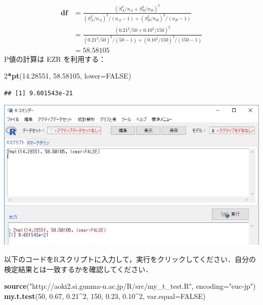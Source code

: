 \documentclass[11pt,]{problemset}
\newenvironment{Shaded}{\begin{snugshade}}{\end{snugshade}}
\newcommand{\DataTypeTok}[1]{\textcolor[rgb]{0.13,0.29,0.53}{#1}}
\newcommand{\DecValTok}[1]{\textcolor[rgb]{0.00,0.00,0.81}{#1}}
\newcommand{\FloatTok}[1]{\textcolor[rgb]{0.00,0.00,0.81}{#1}}
\newcommand{\KeywordTok}[1]{\textcolor[rgb]{0.13,0.29,0.53}{\textbf{#1}}}
\newcommand{\NormalTok}[1]{#1}
\newcommand{\OperatorTok}[1]{\textcolor[rgb]{0.81,0.36,0.00}{\textbf{#1}}}
\newcommand{\OtherTok}[1]{\textcolor[rgb]{0.56,0.35,0.01}{#1}}
\newcommand{\StringTok}[1]{\textcolor[rgb]{0.31,0.60,0.02}{#1}}
\begin{document}
\[
\begin{aligned}
\mathbf{df} & = \frac{(S^2_A/n_A + S^2_B/n_B)^2}{(S_A^2/n_A)^2/(n_A-1)+(S_B^2/n_B)^2/(n_B-1)} \\
            & = \frac{(0.21^2/50 + 0.10^2/150)^2}{(0.21^2/50)^2/(50-1)+(0.10^2/150)^2/(150-1)} \\
            & = 58.58105
\end{aligned}
\] P値の計算は EZR を利用する：

\begin{Shaded}
\begin{Highlighting}[]
\DecValTok{2}\OperatorTok{*}\KeywordTok{pt}\NormalTok{(}\FloatTok{14.28551}\NormalTok{, }\FloatTok{58.58105}\NormalTok{, }\DataTypeTok{lower=}\OtherTok{FALSE}\NormalTok{)}
\end{Highlighting}
\end{Shaded}

\begin{verbatim}
## [1] 9.601543e-21
\end{verbatim}

\begin{center}\includegraphics[width=0.9\linewidth]{pic/tvaluepvalue01} \end{center}
\bigskip

以下のコードをRスクリプトに入力して，実行をクリックしてください．自分の検定結果とは一致するかを確認してください．

\begin{Shaded}
\begin{Highlighting}[]
\KeywordTok{source}\NormalTok{(}\StringTok{"http://aoki2.si.gunma-u.ac.jp/R/src/my_t_test.R"}\NormalTok{, }\DataTypeTok{encoding=}\StringTok{"euc-jp"}\NormalTok{)}
\KeywordTok{my.t.test}\NormalTok{(}\DecValTok{50}\NormalTok{, }\FloatTok{0.67}\NormalTok{, }\FloatTok{0.21}\OperatorTok{^}\DecValTok{2}\NormalTok{, }\DecValTok{150}\NormalTok{, }\FloatTok{0.23}\NormalTok{, }\FloatTok{0.10}\OperatorTok{^}\DecValTok{2}\NormalTok{, }\DataTypeTok{var.equal=}\OtherTok{FALSE}\NormalTok{)}
\end{Highlighting}
\end{Shaded}
\end{document}
